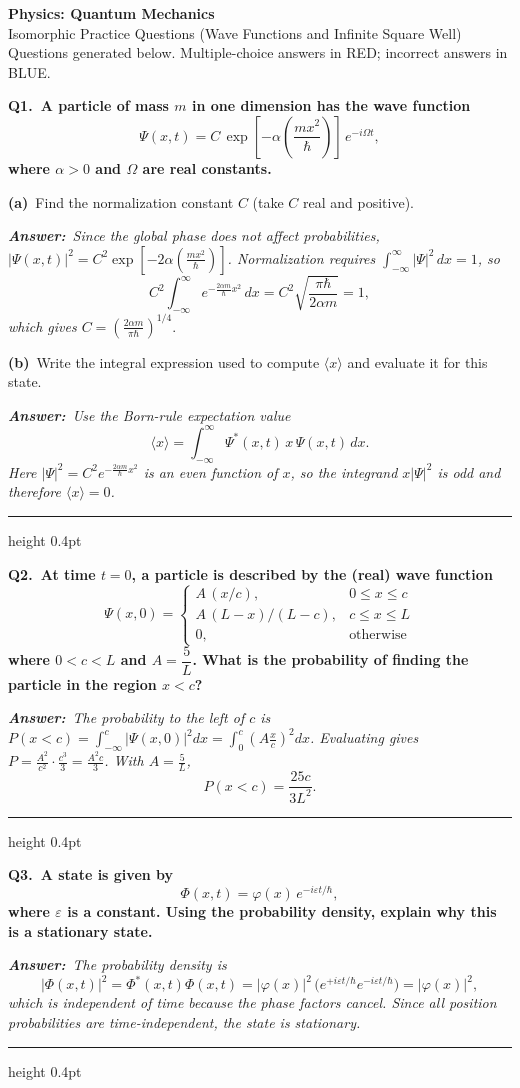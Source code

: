 \documentclass[11pt]{article}
\newcommand{\QuestionStyle}[1]{{\large\bfseries\boldmath #1}}
\newcommand{\OEBlock}[3]{%
  \Needspace{5\baselineskip}%
  \noindent
  \begin{minipage}{\linewidth}
    \QuestionStyle{#1.~#2}

    \vspace{0.25em}
    \noindent\textit{\textbf{Answer:}~#3}

    \vspace{0.25em}
    \hrule height 0.4pt
  \end{minipage}
  \vspace{0.75em}
}
\newcommand{\MPBlock}[3]{%
  \Needspace{8\baselineskip}%
  \noindent
  \begin{minipage}{\linewidth}
    \QuestionStyle{#1.~#2}

    \vspace{0.25em}
    #3

    \vspace{0.25em}
    \hrule height 0.4pt
  \end{minipage}
  \vspace{0.75em}
}
\newcommand{\OEPart}[3]{%
  \par\vspace{0.35em}
  \noindent\textbf{(#1)}~#2
  \par\vspace{0.15em}
  \noindent\textit{\textbf{Answer:}~#3}
  \par
}
\begin{document}
\begin{center}
{\huge \textbf{Physics: Quantum Mechanics}}\\[0.25em]
{\Large Isomorphic Practice Questions (Wave Functions and Infinite Square Well)}\\[0.25em]
{\large Questions generated below. Multiple-choice answers in RED; incorrect answers in BLUE.}
\end{center}

\vspace{0.75em}

\MPBlock{Q1}{A particle of mass \(m\) in one dimension has the wave function
\[
\Psi(x,t)=C\,\exp\!\left[-\alpha\left(\frac{m x^2}{\hbar}\right)\right]\,e^{-i\Omega t},
\]
where \(\alpha>0\) and \(\Omega\) are real constants.}{
  \OEPart{a}{Find the normalization constant \(C\) (take \(C\) real and positive).}{Since the global phase does not affect probabilities, \(|\Psi(x,t)|^2=C^2\exp\!\left[-2\alpha\left(\frac{m x^2}{\hbar}\right)\right]\). Normalization requires \(\int_{-\infty}^{\infty} |\Psi|^2\,dx=1\), so
\[
C^2\int_{-\infty}^{\infty}e^{-\frac{2\alpha m}{\hbar}x^2}\,dx= C^2\sqrt{\frac{\pi\hbar}{2\alpha m}}=1,
\]
which gives \(C=\left(\frac{2\alpha m}{\pi\hbar}\right)^{1/4}.\)}
  \OEPart{b}{Write the integral expression used to compute \(\langle x\rangle\) and evaluate it for this state.}{Use the Born-rule expectation value
\[\langle x\rangle=\int_{-\infty}^{\infty}\Psi^*(x,t)\,x\,\Psi(x,t)\,dx.\]
Here \(|\Psi|^2=C^2 e^{-\frac{2\alpha m}{\hbar}x^2}\) is an even function of \(x\), so the integrand \(x|\Psi|^2\) is odd and therefore \(\langle x\rangle=0\).}
}

\OEBlock{Q2}{At time \(t=0\), a particle is described by the (real) wave function
\[
\Psi(x,0)=\begin{cases}
A\,(x/c), & 0\le x\le c\\
A\,(L-x)/(L-c), & c\le x\le L\\
0, & \text{otherwise}
\end{cases}
\]
where \(0<c<L\) and \(A=\dfrac{5}{L}\). What is the probability of finding the particle in the region \(x<c\)?}{The probability to the left of \(c\) is \(P(x<c)=\int_{-\infty}^{c}|\Psi(x,0)|^2dx=\int_{0}^{c}\left(A\frac{x}{c}\right)^2dx\). Evaluating gives \(P=\frac{A^2}{c^2}\cdot\frac{c^3}{3}=\frac{A^2 c}{3}\). With \(A=\frac{5}{L}\),
\[P(x<c)=\frac{25c}{3L^2}.\]}

\OEBlock{Q3}{A state is given by
\[
\Phi(x,t)=\varphi(x)\,e^{-i\varepsilon t/\hbar},
\]
where \(\varepsilon\) is a constant. Using the probability density, explain why this is a stationary state.}{The probability density is
\[|\Phi(x,t)|^2=\Phi^*(x,t)\Phi(x,t)=|\varphi(x)|^2\,\big(e^{+i\varepsilon t/\hbar}e^{-i\varepsilon t/\hbar}\big)=|\varphi(x)|^2,\]
which is independent of time because the phase factors cancel. Since all position probabilities are time-independent, the state is stationary.}
\end{document}
